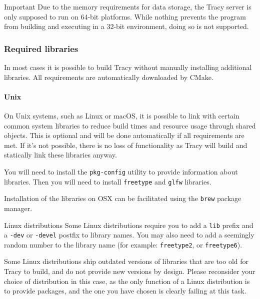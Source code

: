 \documentclass[hidelinks,titlepage,a4paper,twoside]{article}
\begin{document}
\begin{bclogo}[
noborder=true,
couleur=black!5,
logo=\bcbombe
]{Important}
Due to the memory requirements for data storage, the Tracy server is only supposed to run on 64-bit platforms. While nothing prevents the program from building and executing in a 32-bit environment, doing so is not supported.
\end{bclogo}

\subsubsection{Required libraries}

In most cases it is possible to build Tracy without manually installing additional libraries. All requirements are automatically downloaded by CMake.

\paragraph{Unix}

On Unix systems, such as Linux or macOS, it is possible to link with certain common system libraries to reduce build times and resource usage through shared objects. This is optional and will be done automatically if all requirements are met. If it's not possible, there is no loss of functionality as Tracy will build and statically link these libraries anyway.

You will need to install the \texttt{pkg-config} utility to provide information about libraries. Then you will need to install \texttt{freetype} and \texttt{glfw} libraries.

Installation of the libraries on OSX can be facilitated using the \texttt{brew} package manager.

\begin{bclogo}[
noborder=true,
couleur=black!5,
logo=\bcbombe
]{Linux distributions}
Some Linux distributions require you to add a \texttt{lib} prefix and a \texttt{-dev} or \texttt{-devel} postfix to library names. You may also need to add a seemingly random number to the library name (for example: \texttt{freetype2}, or \texttt{freetype6}).

Some Linux distributions ship outdated versions of libraries that are too old for Tracy to build, and do not provide new versions by design. Please reconsider your choice of distribution in this case, as the only function of a Linux distribution is to provide packages, and the one you have chosen is clearly failing at this task.
\end{bclogo}
\end{document}
